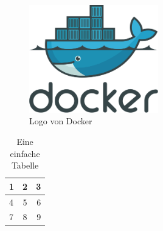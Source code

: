 \documentclass[12pt, a5paper]{book}
\begin{document}
\begin{figure}
  \centering
    \includegraphics[width=0.5\textwidth]{Docker.png}
    \caption{Logo von Docker}
    \label{fig:logo}
\end{figure}

\begin{table}
  \centering
    \begin{tabular}{| l | c | r |}
    \hline
    1 & 2 & 3 \\[5mm] \hline
    4 & 5 & 6 \\ \hline
    7 & 8 & 9 \\
    \hline
    \end{tabular}
  \caption{Eine einfache Tabelle}
\end{table}
\end{document}
